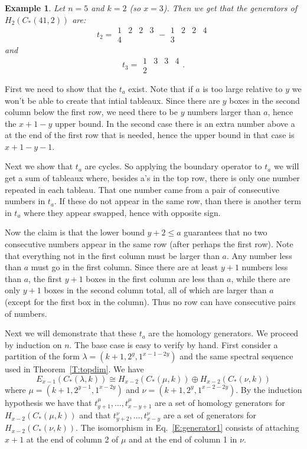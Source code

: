\documentclass{elsart}
\newtheorem{example}[theorem]{Example}
\begin{document}
\begin{example}
  Let $n=5$ and $k=2$ (so $x=3$). Then we get that the generators of $H_2(C_*(41,2))$ are:
  $$t_2 = \begin{array}{cccc} 1 & 2 & 2 & 3 \\ 4 \end{array}
        - \begin{array}{cccc} 1 & 2 & 2 & 4 \\ 3 \end{array}$$ and
  $$t_3 = \begin{array}{cccc} 1 & 3 & 3 & 4 \\ 2 \end{array}.$$
\end{example}
\begin{pf}
  First we need to show that the $t_a$ exist. Note that if $a$ is too large relative to $y$ we won't be able to create that intial tableaux. 
  Since there are $y$ boxes in the second column below the first row, we need there to be $y$ numbers larger than $a$, hence the $x+1-y$ upper bound. In the 
  second case there is an extra number above a at the end of the first row that is needed, hence the upper bound in that case is $x+1-y-1$.
  

  Next we show that $t_a$ are cycles. So applying the boundary operator to  $t_a$ we will get a sum of tableaux where, besides 
  a's in the top row, there is only one number repeated in each tableau. That one number came from a pair of consecutive numbers in $t_a$.
  If these do not appear in the same row, than there is another term in $t_a$ where they appear swapped, hence with opposite sign. 

  Now the claim is that the lower bound $y+2 \le a$ guarantees that no two consecutive numbers appear in the same row (after perhaps the 
  first row). Note that everything not in the first column must be larger than $a$. Any number less than $a$
  must go in the first column. Since there are at least $y+1$ numbers less than $a$, the first $y+1$ boxes in the first column are less 
  than $a$, while there are only $y+1$ boxes in the second column total, all of which are larger than $a$ (except for the first box in the
  column). Thus no row can have consecutive pairs of numbers.

  Next we will demonstrate that these $t_a$ are the homology generators. We proceed by induction on $n$. The base case is easy to verify by 
  hand. First  consider a partition of the form $\lambda = (k+1, 2^y, 1^{x-1-2y})$ and the same spectral sequence used in 
  Theorem~\ref{T:topdim}. We have 
  \begin{equation} \label{E:generator1} 
    E_{x-1}(C_*(\lambda,k)) \cong H_{x-2}(C_*(\mu,k)) \oplus H_{x-2}(C_*(\nu,k))
  \end{equation}
  where $\mu = (k+1, 2^{y-1}, 1^{x-2y})$ and
  $\nu = (k+1, 2^y, 1^{x-2-2y})$. By the induction hypothesis we have that $t^{\mu}_{y+1}, \ldots, t^\mu_{x-y+1}$ are a set of homology 
  generators for $H_{x-2}(C_*(\mu,k))$ and that $t^{\nu}_{y+2}, \ldots, t^\nu_{x-y}$ are a set of generators for $H_{x-2}(C_*(\nu,k))$. The isomorphism in
  Eq.~\ref{E:generator1} consists of attaching $x+1$ at the end of column 2 of $\mu$ and at the end of column 1 in $\nu$. 


\end{pf}
\end{document}
